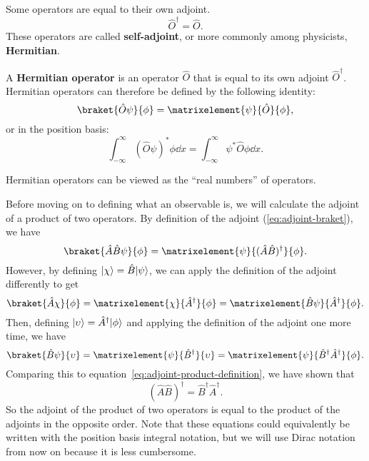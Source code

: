 \documentclass[../quantum_mechanics.tex]{subfiles}
\begin{document}
            Some operators are equal to their own adjoint.
            \begin{equation}
                \hat{O}^\dagger=\hat{O}.
            \end{equation}
            These operators are called \textbf{self-adjoint}, or more commonly among physicists, \textbf{Hermitian}.
            \begin{definition}
                A \textbf{Hermitian operator} is an operator $\hat{O}$ that is equal to its own adjoint $\hat{O}^\dagger$.
                Hermitian operators can therefore be defined by the following identity:
                \begin{equation}
                    \braket{\hat{O}\psi}{\phi}=\matrixelement{\psi}{\hat{O}}{\phi},
                \end{equation}
                or in the position basis:
                \begin{equation}
                    \int_{-\infty}^\infty(\hat{O}\psi)^\ast\phi\dd{x}=\int_{-\infty}^\infty\psi^\ast\hat{O}\phi\dd{x}.
                \end{equation}
            \end{definition}
            Hermitian operators can be viewed as the ``real numbers'' of operators.

            Before moving on to defining what an observable is, we will calculate the adjoint of a product of two operators.
            By definition of the adjoint (\ref{eq:adjoint-braket}), we have
            \begin{equation}\label{eq:adjoint-product-definition}
                \braket{\hat{A}\hat{B}\psi}{\phi}=\matrixelement{\psi}{(\hat{A}\hat{B})^\dagger}{\phi}.
            \end{equation}
            However, by defining $\lvert\chi\rangle=\hat{B}\lvert\psi\rangle$, we can apply the definition of the adjoint differently to get
            \begin{equation}
                \braket{\hat{A}\chi}{\phi}=\matrixelement{\chi}{\hat{A}^\dagger}{\phi}=\matrixelement{\hat{B}\psi}{\hat{A}^\dagger}{\phi}.
            \end{equation}
            Then, defining $\lvert\upsilon\rangle=\hat{A}^\dagger\lvert\phi\rangle$ and applying the definition of the adjoint one more time, we have
            \begin{equation}
                \braket{\hat{B}\psi}{\upsilon}=\matrixelement{\psi}{\hat{B}^\dagger}{\upsilon}=\matrixelement{\psi}{\hat{B}^\dagger\hat{A}^\dagger}{\phi}.
            \end{equation}
            Comparing this to equation~\ref{eq:adjoint-product-definition}, we have shown that
            \begin{equation}
                (\hat{A}\hat{B})^\dagger=\hat{B}^\dagger\hat{A}^\dagger.
            \end{equation}
            So the adjoint of the product of two operators is equal to the product of the adjoints in the opposite order. 
            Note that these equations could equivalently be written with the position basis integral notation, but we will use Dirac notation from now on because it is less cumbersome.  
\end{document}
